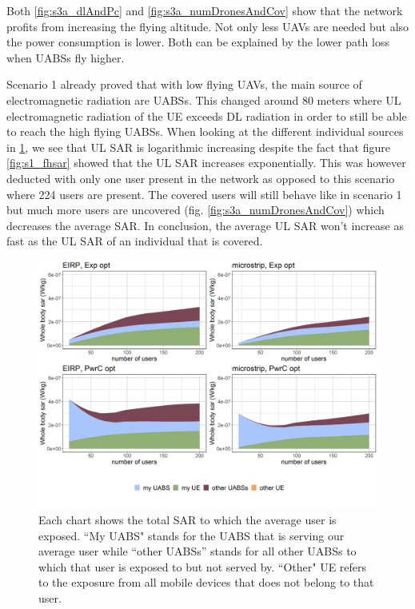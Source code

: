 Both  \ref{fig:s3a_dlAndPc} and \ref{fig:s3a_numDronesAndCov} show that the network profits from increasing the flying altitude. 
Not only less \gls{UAV}s are needed but also the power consumption is lower. Both can be explained by the lower path loss when \gls{UABS}s fly higher.

Scenario 1 already proved that with low flying \gls{UAV}s, the main source of electromagnetic radiation are \gls{UABS}s. 
This changed around 80 meters where \gls{UL} electromagnetic radiation of the \gls{UE}
exceeds \gls{DL} radiation in order to still be able to reach the high flying \gls{UABS}s. 
When looking at the different individual sources in \ref{fig:s3a_fourSourcesMatrix}, we see 
that \gls{UL} \gls{SAR} is logarithmic increasing despite the fact that figure \ref{fig:s1_fhsar} showed that the  \gls{UL} \gls{SAR} 
increases exponentially. This was however deducted with only one user present in the network as opposed to this scenario 
where 224 users are present. The covered users will still behave like in scenario 1 but much more users are uncovered (fig. \ref{fig:s3a_numDronesAndCov}) 
which decreases the average \gls{SAR}. 
In conclusion, the average  \gls{UL} \gls{SAR}  won't increase as fast as the \gls{UL} \gls{SAR} of 
an individual that is covered.

\begin{figure}[]
  \includegraphics[width=\textwidth]{../results/s3/fhFourSources.png}
  \caption{Each chart shows the total SAR to which the average user is exposed. ``My UABS" stands for the UABS that is serving our average user while ``other UABSs'' stands for 
  all other UABSs to which that user is exposed to but not served by. ``Other" UE refers to the exposure from all mobile devices that does not belong to that user.}
  \label{fig:s3a_fourSourcesMatrix}
\end{figure}


